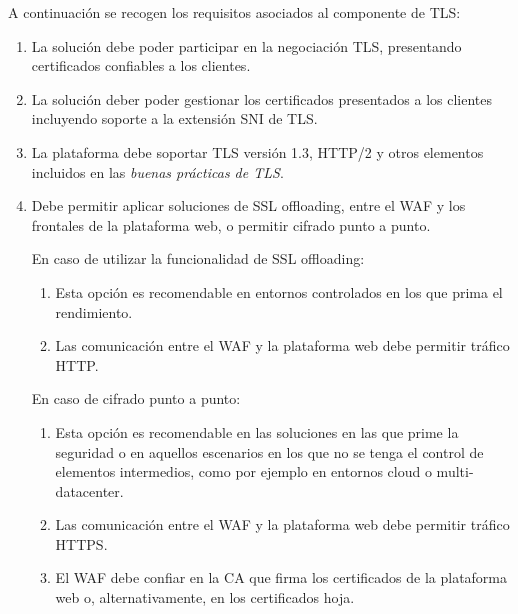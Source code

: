 \par A continuación se recogen los requisitos asociados al componente de TLS:
\begin{enumerate}[\bfseries{}R1. ]
  \item La solución debe poder participar en la negociación TLS, presentando certificados confiables a los clientes.
  \item La solución deber poder gestionar los certificados presentados a los clientes incluyendo soporte a la extensión \acrshort{SNI} de TLS.
  \item La plataforma debe soportar TLS versión 1.3, HTTP/2 y otros elementos incluidos en las {\em buenas prácticas de TLS\cite{TLSBestPractices}}.
  \item Debe permitir aplicar soluciones de SSL offloading, entre el WAF y los frontales de la plataforma web, o permitir cifrado punto a punto.
    \par En caso de utilizar la funcionalidad de SSL offloading:
      \begin{enumerate}[label=\emph{\alph*})]
        \item Esta opción es recomendable en entornos controlados en los que prima el rendimiento.
        \item Las comunicación entre el WAF y la plataforma web debe permitir tráfico HTTP.
      \end{enumerate}
    \par En caso de cifrado punto a punto:
      \begin{enumerate}[label=\emph{\alph*})]
        \item Esta opción es recomendable en las soluciones en las que prime la seguridad o en aquellos escenarios en los que no se tenga el control de elementos intermedios, como por ejemplo en entornos cloud o multi-datacenter.
        \item Las comunicación entre el WAF y la plataforma web debe permitir tráfico HTTPS.
        \item El WAF debe confiar en la CA que firma los certificados de la plataforma web o, alternativamente, en los certificados hoja.
      \end{enumerate}
\end{enumerate}

